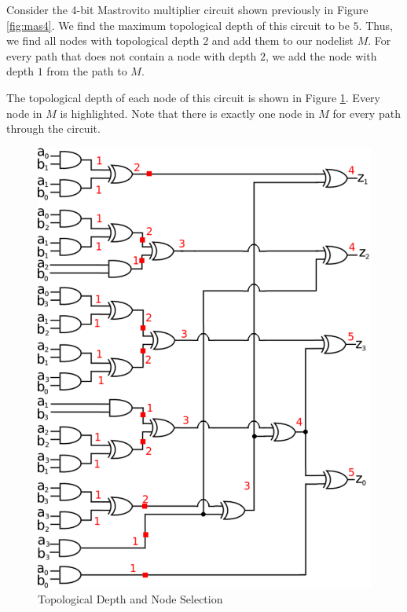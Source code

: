 \begin{Example}
Consider the 4-bit Mastrovito multiplier circuit shown
previously in Figure \ref{fig:mas4}. We find the maximum topological depth
of this circuit to be $5$. Thus, we find all nodes with topological
depth $2$ and add them to our nodelist $M$. For every path that does not
contain a node with depth $2$, we add the node with depth $1$ from the path
to $M$.

The topological depth of each node of this circuit is shown in 
Figure \ref{fig:nodes}. Every node in $M$ is highlighted. Note that there
is exactly one node in $M$ for every path through the circuit.

\begin{figure}
	\begin{center}
	\includegraphics[scale=0.7]{figures/mul4bitTopo2.eps}
	\end{center}
	\caption{Topological Depth and Node Selection}
	\label{fig:nodes}
\end{figure}
\label{exp:mul4topex}
\end{Example}

